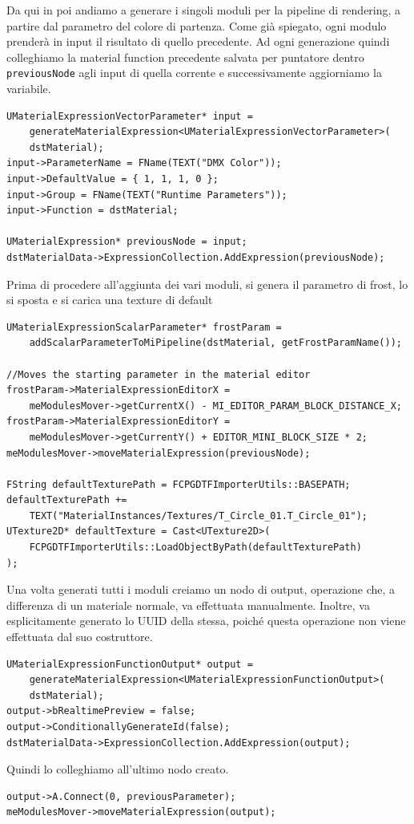 \documentclass[main.tex]{subfiles}
\begin{document}
Da qui in poi andiamo a generare i singoli moduli per la pipeline di rendering, a partire dal parametro del colore di partenza. Come già spiegato, ogni modulo prenderà in input il risultato di quello precedente. Ad ogni generazione quindi colleghiamo la material function precedente salvata per puntatore dentro \lstinline{previousNode} agli input di quella corrente e successivamente aggiorniamo la variabile.
\begin{lstlisting}
UMaterialExpressionVectorParameter* input =
    generateMaterialExpression<UMaterialExpressionVectorParameter>(
    dstMaterial);
input->ParameterName = FName(TEXT("DMX Color"));
input->DefaultValue = { 1, 1, 1, 0 };
input->Group = FName(TEXT("Runtime Parameters"));
input->Function = dstMaterial;

UMaterialExpression* previousNode = input;
dstMaterialData->ExpressionCollection.AddExpression(previousNode);
\end{lstlisting}
Prima di procedere all'aggiunta dei vari moduli, si genera il parametro di frost, lo si sposta e si carica una texture di default 
\begin{lstlisting}
UMaterialExpressionScalarParameter* frostParam =
    addScalarParameterToMiPipeline(dstMaterial, getFrostParamName());

//Moves the starting parameter in the material editor
frostParam->MaterialExpressionEditorX =
    meModulesMover->getCurrentX() - MI_EDITOR_PARAM_BLOCK_DISTANCE_X;
frostParam->MaterialExpressionEditorY =
    meModulesMover->getCurrentY() + EDITOR_MINI_BLOCK_SIZE * 2;
meModulesMover->moveMaterialExpression(previousNode);

FString defaultTexturePath = FCPGDTFImporterUtils::BASEPATH;
defaultTexturePath +=
    TEXT("MaterialInstances/Textures/T_Circle_01.T_Circle_01");
UTexture2D* defaultTexture = Cast<UTexture2D>(
    FCPGDTFImporterUtils::LoadObjectByPath(defaultTexturePath)
);
\end{lstlisting}


Una volta generati tutti i moduli creiamo un nodo di output, operazione che, a differenza di un materiale normale, va effettuata manualmente. Inoltre, va esplicitamente generato lo UUID della stessa, poiché questa operazione non viene effettuata dal suo costruttore. 
\begin{lstlisting}
UMaterialExpressionFunctionOutput* output =
    generateMaterialExpression<UMaterialExpressionFunctionOutput>(
    dstMaterial);
output->bRealtimePreview = false;
output->ConditionallyGenerateId(false);
dstMaterialData->ExpressionCollection.AddExpression(output);
\end{lstlisting}
Quindi lo colleghiamo all'ultimo nodo creato.
\begin{lstlisting}
output->A.Connect(0, previousParameter);
meModulesMover->moveMaterialExpression(output);
\end{lstlisting}

\begin{lstlisting}
\end{lstlisting}
\end{document}
